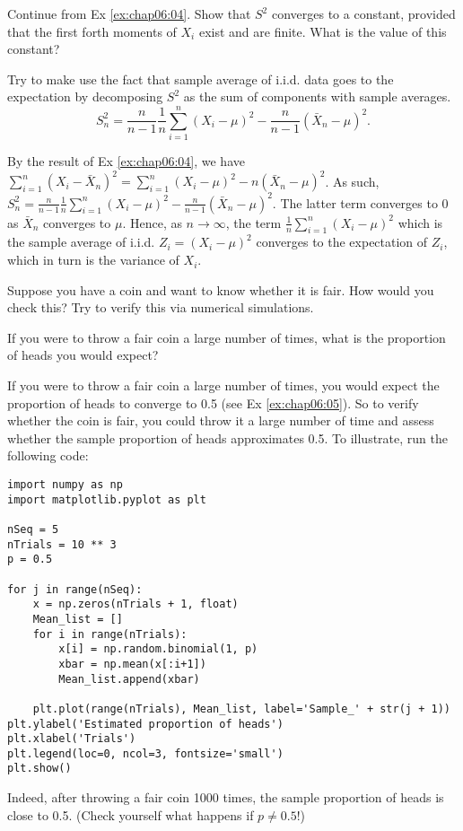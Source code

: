 	\begin{exercise}\label{ex:chap06:07}
	Continue from Ex \ref{ex:chap06:04}. Show that $S^2$ converges to a constant, provided that the first forth moments of $X_i$ exist and are finite. What is the value of this constant?
	\begin{hint}
		Try to make use the fact that sample average of i.i.d. data goes to the expectation by decomposing $S^2$ as the sum of components with sample averages.  $$S_n^2 = \frac{n}{n - 1}\frac{1}{n} \sum_{i = 1}^n (X_i - \mu)^2 - \frac{n}{n - 1} (\bar{X}_n - \mu)^2.$$
	\end{hint}
	\begin{solution}
		By the result of Ex \ref{ex:chap06:04}, we have $\sum_{i = 1}^n (X_i - \bar{X}_n)^2 = \sum_{i = 1}^n (X_i - \mu)^2 - n (\bar{X}_n - \mu)^2$. As such, $S_n^2 = \frac{n}{n - 1}\frac{1}{n} \sum_{i = 1}^n (X_i - \mu)^2 - \frac{n}{n - 1} (\bar{X}_n - \mu)^2$. The latter term converges to $0$ as $\bar{X}_n$ converges to $\mu$. Hence, as $n \to \infty$, the term $\frac{1}{n} \sum_{i = 1}^n (X_i - \mu)^2$ which is the sample average of i.i.d. $Z_i=(X_i - \mu)^2$ converges to the expectation of $Z_i$, which in turn is the variance of $X_i$. 
		\end{solution}
	\end{exercise}
	
	\begin{exercise} 
	Suppose you have a coin and want to know whether it is fair. How would you check this? Try to verify this via numerical simulations.
		\begin{hint}
			If you were to throw a fair coin a large number of times, what is the proportion of heads you would expect?
		\end{hint}
		\begin{solution}
		If you were to throw a fair coin a large number of times, you would expect the proportion of heads to converge to 0.5 (see Ex \ref{ex:chap06:05}). So to verify whether the coin is fair, you could throw it a large number of time and assess whether the sample proportion of heads approximates 0.5. To illustrate, run the following code:
\begin{verbatim}
import numpy as np
import matplotlib.pyplot as plt

nSeq = 5
nTrials = 10 ** 3
p = 0.5

for j in range(nSeq):
    x = np.zeros(nTrials + 1, float)
    Mean_list = []
    for i in range(nTrials):
        x[i] = np.random.binomial(1, p)
        xbar = np.mean(x[:i+1])
        Mean_list.append(xbar)

    plt.plot(range(nTrials), Mean_list, label='Sample_' + str(j + 1))
plt.ylabel('Estimated proportion of heads')
plt.xlabel('Trials')
plt.legend(loc=0, ncol=3, fontsize='small')
plt.show()
\end{verbatim}
		Indeed, after throwing a fair coin 1000 times, the sample proportion of heads is close to 0.5. (Check yourself what happens if $p \neq 0.5$!)
		\end{solution}
	\end{exercise}
	
